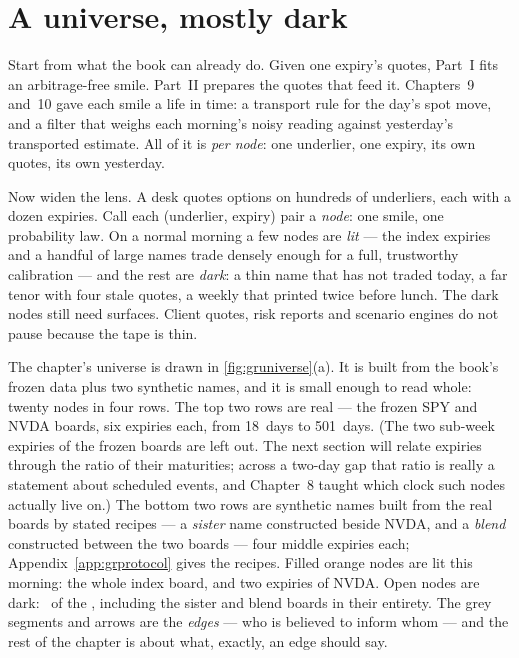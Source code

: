 \section{A universe, mostly dark}
\label{sec:grdark}

Start from what the book can already do.  Given one expiry's quotes,
Part~I fits an arbitrage-free smile.  Part~II prepares the quotes that
feed it.  Chapters~9 and~10 gave each smile a life in time: a transport
rule for the day's spot move, and a filter that weighs each morning's
noisy reading against yesterday's transported estimate.  All of it is
\emph{per node}: one underlier, one expiry, its own quotes, its own
yesterday.

Now widen the lens.  A desk quotes options on hundreds of underliers,
each with a dozen expiries.  Call each (underlier, expiry) pair a
\emph{node}: one smile, one probability law.  On a normal morning a few
nodes are \emph{lit} --- the index expiries and a handful of large
names trade densely enough for a full, trustworthy calibration --- and
the rest are \emph{dark}: a thin name that has not traded today, a far
tenor with four stale quotes, a weekly that printed twice before
lunch.  The dark nodes still need surfaces.  Client quotes, risk
reports and scenario engines do not pause because the tape is thin.

The chapter's universe is drawn in \cref{fig:gruniverse}(a).  It is
built from the book's frozen data plus two synthetic names, and it is
small enough to read whole: twenty nodes in four rows.  The top two
rows are real --- the frozen SPY and NVDA boards, six expiries each,
from 18~days to 501~days.  (The two sub-week expiries of the frozen
boards are left out.  The next section will relate expiries through
the ratio of their maturities; across a two-day gap that ratio is
really a statement about scheduled events, and Chapter~8 taught which
clock such nodes actually live on.)  The bottom two rows are synthetic names built from
the real boards by stated recipes --- a \emph{sister} name constructed
beside NVDA, and a \emph{blend} constructed between the two boards ---
four middle expiries each; Appendix~\ref{app:grprotocol} gives the
recipes.  Filled orange nodes are lit this morning: the whole index
board, and two expiries of NVDA.  Open nodes are dark: \MacGrDarkCount\
of the \MacGrNodeCount, including the sister and blend boards in their
entirety.  The grey segments and arrows are the \emph{edges} --- who is
believed to inform whom --- and the rest of the chapter is about what,
exactly, an edge should say.

